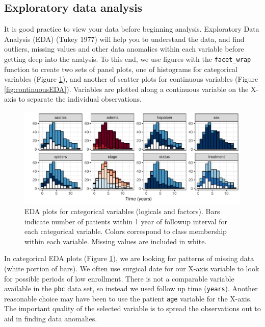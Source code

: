 \documentclass[article]{jss}
\begin{document}
\subsection{Exploratory data analysis}\label{exploratory-data-analysis}

It is good practice to view your data before beginning analysis.
Exploratory Data Analysis (EDA) (Tukey 1977) will help you to understand
the data, and find outliers, missing values and other data anomalies
within each variable before getting deep into the analysis. To this end,
we use  figures with the \texttt{facet\_wrap} function to
create two sets of panel plots, one of histograms for categorical
variables (Figure \ref{fig:categoricalEDA}), and another of scatter
plots for continuous variables (Figure \ref{fig:continuousEDA}).
Variables are plotted along a continuous variable on the X-axis to
separate the individual observations.

\begin{Schunk}
\begin{figure}[!htb]

{\centering \includegraphics{fig-rfs/rfs-categoricalEDA-1} 

}

\caption[EDA plots for categorical variables (logicals and factors)]{EDA plots for categorical variables (logicals and factors). Bars indicate number of patients within 1 year of followup interval for each categorical variable. Colors correspond to class membership within each variable. Missing values are included in white.}\label{fig:categoricalEDA}
\end{figure}
\end{Schunk}

In categorical EDA plots (Figure \ref{fig:categoricalEDA}), we are
looking for patterns of missing data (white portion of bars). We often
use surgical date for our X-axis variable to look for possible periods
of low enrollment. There is not a comparable variable available in the
\texttt{pbc} data set, so instead we used follow up time
(\texttt{years}). Another reasonable choice may have been to use the
patient \texttt{age} variable for the X-axis. The important quality of
the selected variable is to spread the observations out to aid in
finding data anomalies.
\end{document}
